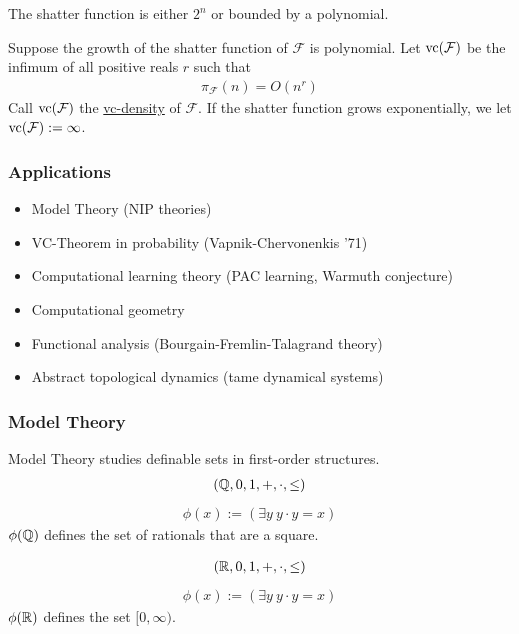 \documentclass{beamer}
\newcommand{\F}{\mathcal F}
\newcommand{\paren}[1]{\left( #1 \right)}
\newcommand{\defn}{\underline}
\begin{document}
\begin{frame}
  \begin{Theorem} 
    The shatter function is either $2^n$ or bounded by a polynomial.
  \end{Theorem}
  \begin{Definition}
    Suppose the growth of the shatter function of $\F$ is polynomial.
    Let $\vc(\F)$ be the infimum of all positive reals $r$ such that
    \begin{align*}
      \pi_\F(n) = O(n^r)
    \end{align*}
    Call $\vc(\F)$ the \defn{vc-density} of $\F$.
    If the shatter function grows exponentially, we let $\vc(\F) := \infty$.
  \end{Definition}
\end{frame}

\begin{frame}
  \frametitle{Applications}
  \begin{itemize}
  \item Model Theory (NIP theories)
  \item VC-Theorem in probability (Vapnik-Chervonenkis '71)
  \item Computational learning theory (PAC learning, Warmuth conjecture)
  \item Computational geometry
  \item Functional analysis (Bourgain-Fremlin-Talagrand theory)
  \item Abstract topological dynamics (tame dynamical systems)
  \end{itemize}
\end{frame}


\begin{frame}
  \frametitle{Model Theory}
  Model Theory studies definable sets in first-order structures.
  \begin{align*}
    (\mathbb{Q}, 0, 1, +, \cdot, \leq)
  \end{align*}
  \begin{align*}
    \phi(x) := \paren{\exists y \ y \cdot y = x}
  \end{align*}
  $\phi(\mathbb{Q})$ defines the set of rationals that are a square.
\end{frame}

\begin{frame}
  \begin{align*}
    (\mathbb{R}, 0, 1, +, \cdot, \leq)
  \end{align*}
  \begin{align*}
    \phi(x) := \paren{\exists y \ y \cdot y = x}
  \end{align*}
  $\phi(\mathbb{R})$ defines the set $[0, \infty)$.
\end{frame}
\end{document}
